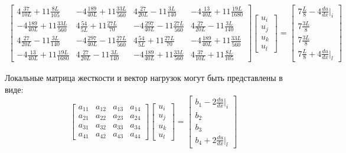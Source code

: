 \begin{align}\label{cub}
\begin{bmatrix}
    4 \frac{37}{10L}    +11 \frac{8L}{105}   &   -4  \frac{189}{40L}   +11 \frac{33L}{560}   & 4 \frac{27}{20L}   -11 \frac{3L}{140}   &   -4  \frac{13}{40L}    +11 \frac{19L}{1680}   \\
	  -4  \frac{189}{40L}    +11 \frac{33L}{560}   & 4 \frac{54}{5L}  +11 \frac{27L}{70}  &   -4  \frac{297}{40L}   -11 \frac{27L}{560}   & 4 \frac{27}{20L}    -11 \frac{3L}{140}   \\
	4 \frac{27}{20L}     -11 \frac{3L}{140}   &   -4  \frac{297}{40L}   -11 \frac{27L}{560}   & 4 \frac{54}{5L}  +11 \frac{27L}{70}   &   -4  \frac{189}{40L}    +11 \frac{33L}{560}   \\
	  -4  \frac{13}{40L}    +11 \frac{19L}{1680}   & 4 \frac{27}{20L}   -11 \frac{3L}{140}   &   -4  \frac{189}{40L}   +11 \frac{33L}{560}   & 4 \frac{37}{10L}    +11 \frac{8L}{105}  
\end{bmatrix}
\begin{bmatrix}
	u_i \\
	u_j \\
	u_k\\
	u_l
\end{bmatrix}
=
\begin{bmatrix}
    7\frac{L}{8}   -4  \frac{du}{dx}|_i \\
	7\frac{3L}{8}\\
	7\frac{3L}{8}\\
	7\frac{L}{8}   +4  \frac{du}{dx}|_l
\end{bmatrix}
\end{align}

Локальные матрица жесткости и вектор нагрузок могут быть представлены в виде:
$$ \begin{bmatrix}
a_{11}     &  a_{12}  &  a_{13} &  a_{14}\\
a_{21}     &  a_{22}  &  a_{23} &  a_{24}\\
a_{31}     &  a_{32}  &  a_{33} &  a_{34}\\
a_{41}     &  a_{42}  & a_{43}  &  a_{44}
\end{bmatrix}
\begin{bmatrix}
u_i \\
u_j \\
u_k\\
u_l
\end{bmatrix} =
\begin{bmatrix}
b_1 - 2 \frac{du}{dx}|_i \\
b_2\\
b_3\\
b_4 + 2 \frac{du}{dx}|_l
\end{bmatrix}$$


